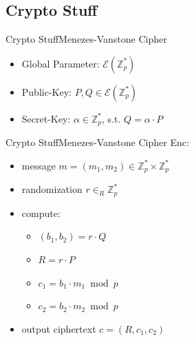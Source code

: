 \subsection{Crypto Stuff}
\begin{frame}{Crypto Stuff}{Menezes-Vanstone Cipher}
    \begin{itemize}
        \item Global Parameter: $\mathcal{E}(\mathbb{Z}_p^*)$
        \item Public-Key: $P, Q \in \mathcal{E}(\mathbb{Z}_p^*)$
        \item Secret-Key: $\alpha \in \mathbb{Z}_p^*$, s.t. $Q = \alpha \cdot P$
    \end{itemize}
\end{frame}

\begin{frame}{Crypto Stuff}{Menezes-Vanstone Cipher}
    Enc:
    \begin{itemize}
        \item message $m = (m_1,m_2) \in \mathbb{Z}_p^* \times \mathbb{Z}_p^*$
        \item randomization $r \in_R \mathbb{Z}_p^*$\\
        \item compute:
            \begin{itemize}
                \item $(b_1,b_2) = r \cdot Q$
                \item $R = r \cdot P$
                \item $c_1 = b_1 \cdot m_1 \bmod p$
                \item $c_2 = b_2 \cdot m_2 \bmod p$
            \end{itemize}
        \item output ciphertext $c = (R, c_1, c_2)$
    \end{itemize}
\end{frame}

